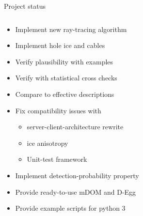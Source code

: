 
\begin{frame}[fragile]{Project status}

  \begin{columns}
    \begin{column}{0.5\textwidth}
      \begin{overlayarea}{\textwidth}{\textheight}
        \begin{itemize}
          \item<alert@1>[\done] Implement new ray-tracing algorithm
          \item<alert@2>[\done] Implement hole ice and cables
          \item<alert@3>[\done] Verify plausibility with examples
          \item<alert@4>[\done] Verify with statistical cross checks
          \item<alert@5>[\done] Compare to effective descriptions
          \item<alert@6>[\inprogress] Fix compatibility issues with
          \begin{itemize}
            \item[\inprogress] server-client-architecture rewrite
            \item[\tobedone] ice anisotropy
            \item[\tobedone] Unit-test framework
          \end{itemize}
          \item<alert@7>[\tobedone] Implement detection-probability property
          \item<alert@8>[\tobedone] Provide ready-to-use mDOM and D-Egg
          \item<alert@9>[\tobedone] Provide example scripts for python 3
        \end{itemize}
      \end{overlayarea}
    \end{column}
    \begin{column}{0.5\textwidth}%
\end{column}
\end{columns}
\end{frame}
